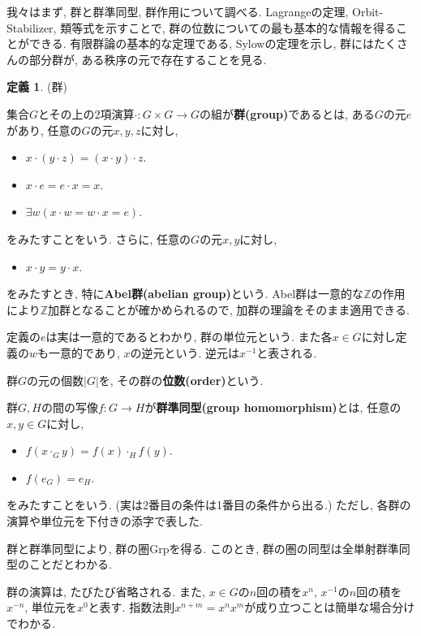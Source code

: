 \documentclass[a4paper, twoside]{bxjsarticle}
\newcommand{\zah}{\mathbb{Z}}
\newcommand{\abs}[1]{\left\lvert#1\right\rvert}
\newcommand{\mr}{\mathrm}
\newcommand{\tb}{\textbf}
\theoremstyle{definition}
\newtheorem{defn}[thm]{定義}
\begin{document}
    我々はまず, 群と群準同型, 群作用について調べる.
    Lagrangeの定理, Orbit-Stabilizer, 類等式を示すことで, 群の位数についての最も基本的な情報を得ることができる.
    有限群論の基本的な定理である, Sylowの定理を示し, 群にはたくさんの部分群が, ある秩序の元で存在することを見る.
    
    \begin{defn}
        (群)

        集合$G$とその上の2項演算$\cdot\colon G\times G\to G$の組が\tb{群(group)}であるとは, ある$G$の元$e$があり, 任意の$G$の元$x, y, z$に対し,
        \begin{itemize}
            \item $x\cdot(y\cdot z)=(x\cdot y)\cdot z$.
            \item $x\cdot e = e\cdot x = x$.
            \item $\exists w(x\cdot w = w\cdot x = e)$.
        \end{itemize}
        をみたすことをいう. さらに, 任意の$G$の元$x, y$に対し, 
        \begin{itemize}
            \item $x\cdot y = y\cdot x$.
        \end{itemize}
        をみたすとき, 特に\tb{Abel群(abelian group)}という. Abel群は一意的な$\zah$の作用により$\zah$加群となることが確かめられるので, 加群の理論をそのまま適用できる.

        定義の$e$は実は一意的であるとわかり, 群の単位元という. また各$x\in G$に対し定義の$w$も一意的であり, $x$の逆元という. 逆元は$x^{-1}$と表される.

        群$G$の元の個数$\abs{G}$を, その群の\tb{位数(order)}という. 

        群$G, H$の間の写像$f\colon G\to H$が\tb{群準同型(group homomorphism)}とは, 任意の$x, y\in G$に対し,
        \begin{itemize}
            \item $f(x\cdot_G y)=f(x)\cdot_H f(y)$.
            \item $f(e_G)= e_H$.
        \end{itemize}
        をみたすことをいう. (実は2番目の条件は1番目の条件から出る.) ただし, 各群の演算や単位元を下付きの添字で表した. 

        群と群準同型により, 群の圏$\mr{Grp}$を得る. このとき, 群の圏の同型は全単射群準同型のことだとわかる.
    \end{defn}
    群の演算は, たびたび省略される. また, $x\in G$の$n$回の積を$x^n$, $x^{-1}$の$n$回の積を$x^{-n}$, 単位元を$x^0$と表す. 指数法則$x^{n+m}=x^n x^m$が成り立つことは簡単な場合分けでわかる.
\end{document}
